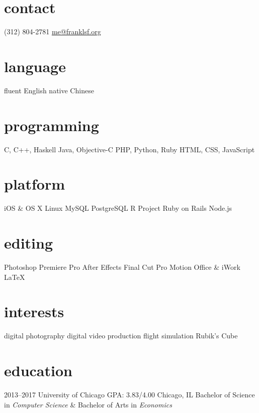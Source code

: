 \documentclass{friggeri-cv} %
\begin{document}


\begin{aside} %
\section{contact}
(312) 804-2781
\underline{me@franklsf.org}
\section{language}
fluent English
native Chinese
\section{programming}
C, C++, Haskell
Java, Objective-C
PHP, Python, Ruby
HTML, CSS, JavaScript
\section{platform}
iOS \& OS X
Linux
MySQL
PostgreSQL
R Project
Ruby on Rails
Node.js
\section{editing}
Photoshop
Premiere Pro
After Effects
Final Cut Pro
Motion
Office \& iWork
{\LaTeX}
\section{interests}
digital photography
digital video production
flight simulation
Rubik’s Cube
\end{aside}


\section{education}

\begin{entrylist}
\entry
{2013--2017}
{University of Chicago}
{GPA: 3.83/4.00\hspace{4em} Chicago, IL}
{Bachelor of Science in \emph{Computer Science} \& Bachelor of Arts in \emph{Economics}}
\end{entrylist}
\end{document}
